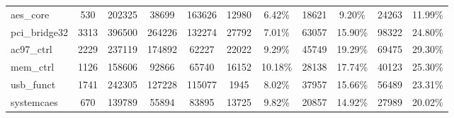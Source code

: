 \begin{table}[]
\begin{tabular}{@{}l|c|ccccccccc}
                                                            aes\_core                & 530                        & \multicolumn{1}{c}{202325}                 & \multicolumn{1}{c}{38699}                    & \multicolumn{1}{c|}{163626}                 & \multicolumn{1}{c}{12980}                       & \multicolumn{1}{c|}{6.42\%}   & \multicolumn{1}{c}{18621}                       & \multicolumn{1}{c|}{9.20\%}   & \multicolumn{1}{c}{24263}                       & 11.99\%  \\ 
                                                            pci\_bridge32            & 3313                       & \multicolumn{1}{c}{396500}                 & \multicolumn{1}{c}{264226}                   & \multicolumn{1}{c|}{132274}                 & \multicolumn{1}{c}{27792}                       & \multicolumn{1}{c|}{7.01\%}   & \multicolumn{1}{c}{63057}                       & \multicolumn{1}{c|}{15.90\%}  & \multicolumn{1}{c}{98322}                       & 24.80\%  \\ 
                                                            ac97\_ctrl               & 2229                       & \multicolumn{1}{c}{237119}                 & \multicolumn{1}{c}{174892}                   & \multicolumn{1}{c|}{62227}                  & \multicolumn{1}{c}{22022}                       & \multicolumn{1}{c|}{9.29\%}   & \multicolumn{1}{c}{45749}                       & \multicolumn{1}{c|}{19.29\%}  & \multicolumn{1}{c}{69475}                       & 29.30\%  \\ 
                                                            mem\_ctrl                & 1126                       & \multicolumn{1}{c}{158606}                 & \multicolumn{1}{c}{92866}                    & \multicolumn{1}{c|}{65740}                  & \multicolumn{1}{c}{16152}                       & \multicolumn{1}{c|}{10.18\%}  & \multicolumn{1}{c}{28138}                       & \multicolumn{1}{c|}{17.74\%}  & \multicolumn{1}{c}{40123}                       & 25.30\%  \\ 
                                                            usb\_funct               & 1741                       & \multicolumn{1}{c}{242305}                 & \multicolumn{1}{c}{127228}                   & \multicolumn{1}{c|}{115077}                 & \multicolumn{1}{c}{1945}                        & \multicolumn{1}{c|}{8.02\%}   & \multicolumn{1}{c}{37957}                       & \multicolumn{1}{c|}{15.66\%}  & \multicolumn{1}{c}{56489}                       & 23.31\%  \\ 
                                                            systemcaes               & 670                        & \multicolumn{1}{c}{139789}                 & \multicolumn{1}{c}{55894}                    & \multicolumn{1}{c|}{83895}                  & \multicolumn{1}{c}{13725}                       & \multicolumn{1}{c|}{9.82\%}   & \multicolumn{1}{c}{20857}                       & \multicolumn{1}{c|}{14.92\%}  & \multicolumn{1}{c}{27989}                       & 20.02\%  \\ 
          \hline
      \end{tabular}
  \end{table}


